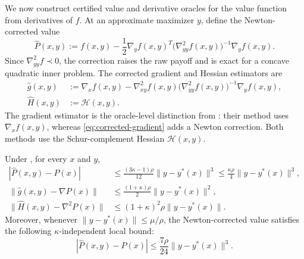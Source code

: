 \documentclass{article}
\begin{document}
We now construct certified value and derivative oracles for the value
function from derivatives of $f$.  At an approximate maximizer $y$,
define the Newton-corrected value
\begin{equation}\label{eq:corrected-value-pf}
 \widehat P(x,y):=f(x,y)
 -\frac12\nabla_y f(x,y)^T
  \bigl(\nabla^2_{yy}f(x,y)\bigr)^{-1}
  \nabla_y f(x,y).
\end{equation}
Since $\nabla^2_{yy}f\prec0$, the correction raises the raw payoff
and is exact for a concave quadratic inner problem.  The corrected
gradient and Hessian estimators are
\begin{subequations}\label{eq:corrected-derivatives}
\begin{align}
  \widehat g(x,y)
  &:=\nabla_xf(x,y)-\nabla^2_{xy}f(x,y)
       \bigl(\nabla^2_{yy}f(x,y)\bigr)^{-1}\nabla_yf(x,y),
       \label{eq:corrected-gradient}\\
  \widehat H(x,y)
  &:=\mathcal H(x,y).
       \label{eq:corrected-hessian}
\end{align}
\end{subequations}
The gradient estimator is the oracle-level distinction from
\citet[Algorithm~2]{luo2022finding}: their method uses
$\nabla_xf(x,y)$, whereas \eqref{eq:corrected-gradient} adds a Newton
correction.  Both methods use the Schur-complement Hessian
$\mathcal H(x,y)$.

\begin{lemma}
\label{lem:corrected-errors}
Under , for every $x$ and $y$,
\begin{subequations}\label{eq:corrected-error-bounds}
\begin{align}
 |\widehat P(x,y)-P(x)|
 &\le\frac{(3\kappa-1)\rho}{12}\|y-y^*(x)\|^3
 \le\frac{\kappa\rho}{4}\|y-y^*(x)\|^3,
       \label{eq:corrected-value-error-pf}\\
 \|\widehat g(x,y)-\nabla P(x)\|
 &\le\frac{(1+\kappa)\rho}{2}\|y-y^*(x)\|^2,
       \label{eq:corrected-gradient-error}\\
 \|\widehat H(x,y)-\nabla^2P(x)\|
 &\le(1+\kappa)^2\rho\|y-y^*(x)\|.
       \label{eq:corrected-hessian-error}
\end{align}
\end{subequations}
Moreover, whenever
$\|y-y^*(x)\|\le\mu/\rho$, the Newton-corrected value satisfies the
following $\kappa$-independent local bound:
\begin{equation}\label{eq:corrected-value-local-error}
 |\widehat P(x,y)-P(x)|
 \le\frac{7\rho}{24}\|y-y^*(x)\|^3.
\end{equation}
\end{lemma}
\end{document}
